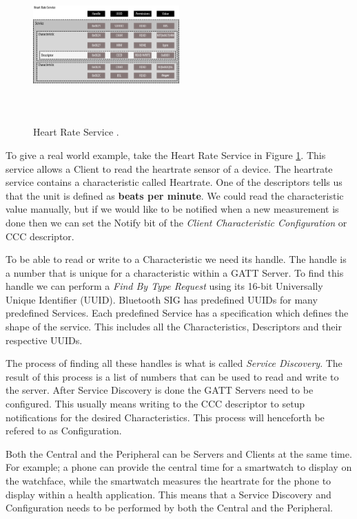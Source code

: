 \begin{figure}[]
    \centering
    \includegraphics[width=0.5\textwidth,height=6cm,keepaspectratio=true]{images/heartrate_service}
    \caption{
        Heart Rate Service \cite{townsend_cufi}.
    }
    \label{fig:hrs_layout}
\end{figure}
To give a real world example, take the Heart Rate Service in Figure \ref{fig:hrs_layout}. This service allows a Client to read the heartrate sensor of a device. The heartrate service contains a characteristic called Heartrate. One of the descriptors tells us that the unit is defined as \textbf{beats per minute}. We could read the characteristic value manually, but if we would like to be notified when a new measurement is done then we can set the Notify bit of the \textit{Client Characteristic Configuration} or CCC descriptor.

To be able to read or write to a Characteristic we need its handle. The handle is a number that is unique for a characteristic within a GATT Server. To find this handle we can perform a \textit{Find By Type Request} using its 16-bit Universally Unique Identifier (UUID). Bluetooth SIG has predefined UUIDs for many predefined Services. Each predefined Service has a specification which defines the shape of the service. This includes all the Characteristics, Descriptors and their respective UUIDs.

The process of finding all these handles is what is called \textit{Service Discovery}. The result of this process is a list of numbers that can be used to read and write to the server. After Service Discovery is done the GATT Servers need to be configured. This usually means writing to the CCC descriptor to setup notifications for the desired Characteristics. This process will henceforth be refered to as Configuration. 

Both the Central and the Peripheral can be Servers and Clients at the same time. For example; a phone can provide the central time for a smartwatch to display on the watchface, while the smartwatch measures the heartrate for the phone to display within a health application. This means that a Service Discovery and Configuration needs to be performed by both the Central and the Peripheral.

